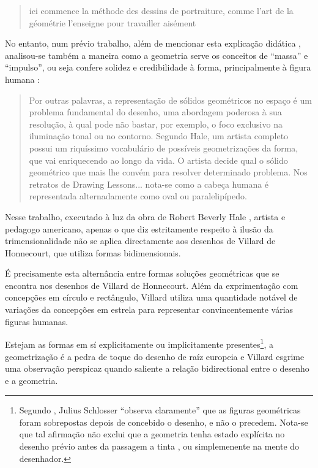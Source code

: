 \documentclass{article}
\begin{document}
\begin{quote}
ici commence la méthode des dessins de portraiture, comme l'art de la
géométrie l'enseigne pour travailler aisément
\end{quote}

No entanto, num prévio trabalho, além de mencionar esta explicação
didática \cite[p. 17]{tavora}, analisou-se também a maneira como a
geometria serve os conceitos de ``massa'' e ``impulso'', ou seja
confere solidez e credibilidade à forma, principalmente à figura
humana \cite[p. 6]{tavora}:

\begin{quote}
  Por outras palavras, a representação de sólidos geométricos no
  espaço é um problema fundamental do desenho, uma abordagem poderosa
  à sua resolução, à qual pode não bastar, por exemplo, o foco
  exclusivo na iluminação tonal ou no contorno. Segundo Hale, um
  artista completo possui um riquíssimo vocabulário de possíveis
  geometrizações da forma, que vai enriquecendo ao longo da vida. O
  artista decide qual o sólido geométrico que mais lhe convém para
  resolver determinado problema. Nos retratos de Drawing
  Lessons... nota-se como a cabeça humana é representada
  alternadamente como oval ou paralelipípedo.
\end{quote}

Nesse trabalho, executado à luz da obra de Robert Beverly Hale
\cite{hale}, artista e pedagogo americano, apenas o que diz
estritamente respeito à ilusão da trimensionalidade não se aplica
directamente aos desenhos de Villard de Honnecourt, que utiliza formas
bidimensionais.

É precisamente esta alternância entre formas soluções geométricas que
se encontra nos desenhos de Villard de Honnecourt. Além da
exprimentação com concepções em círculo e rectângulo, Villard utiliza
uma quantidade notável de variações da concepções em estrela para
representar convincentemente várias figuras humanas.

Estejam as formas em sí explicitamente ou implicitamente
presentes\footnote{Segundo \cite{teresa}, Julius Schlosser ``observa
  claramente'' que as figuras geométricas foram sobrepostas depois de
  concebido o desenho, e não o precedem. Nota-se que tal afirmação não
  exclui que a geometria tenha estado explícita no desenho prévio
  antes da passagem a tinta \cite{calado}, ou simplemenente na mente
  do desenhador.}, a geometrização é a pedra de toque do desenho de
raíz europeia e Villard esgrime uma observação perspicaz quando
saliente a relação bidirectional entre o desenho e a geometria.
\end{document}
